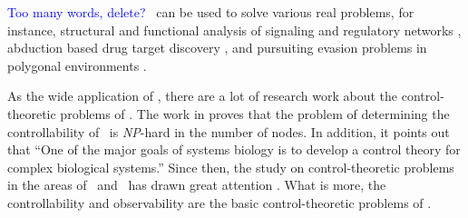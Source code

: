 {\textcolor{blue}{ Too many words, delete?}} \BCNs\ can be used to solve various real problems, for instance, %
structural and functional analysis of signaling and regulatory networks \cite{Kaufman1999A, Klamt2006A}, 
abduction based drug target discovery \cite{Biane2017Abduction}, %
and pursuiting evasion problems in polygonal environments \cite{Thunberg2011A}. 





      

As the wide application of \BCNs, there are a lot of research work about the control-theoretic problems of \BCNs. The work in \cite{Akutsu2007Control} proves that the problem of determining the controllability of \BCNs\ is {\em NP}-hard in the number of nodes. In addition, it points out that ``One of the major goals of systems biology is to develop a control theory for complex biological systems.'' Since then, the study on control-theoretic problems in the areas of \BNs\ and \BCNs\ has drawn great attention \cite{cheng2009controllability, Zhao2010Input, Cheng2011Identification, Cheng2011Analysis,Fornasini2013Observability}. What is more, the controllability and observability are the basic control-theoretic problems of \BCNs. %

